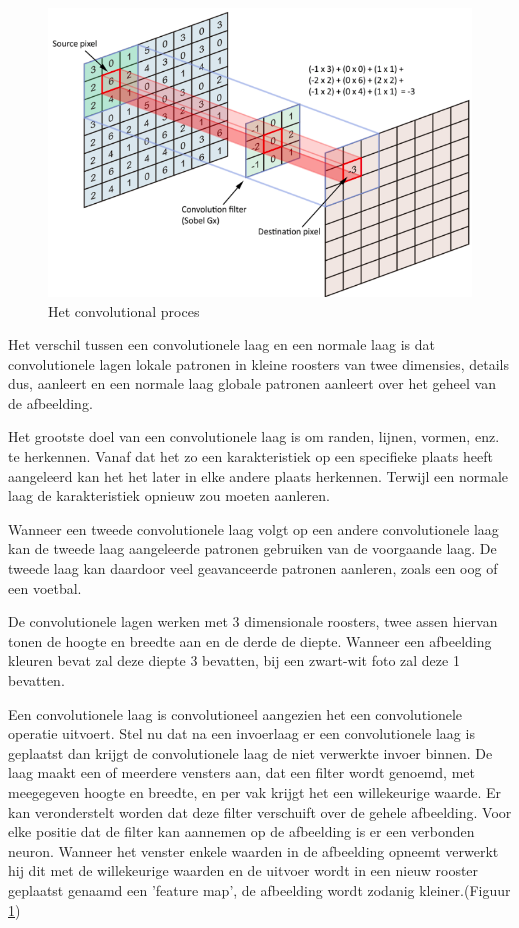 \begin{figure}
	
	
	\includegraphics[width=\linewidth]{img/convolution.png}
	\caption{Het convolutional proces}
	\label{tab:convolutional}
\end{figure}

Het verschil tussen een convolutionele laag en een normale laag is dat convolutionele lagen 
lokale patronen in kleine roosters van twee dimensies, details dus, aanleert en een normale laag globale patronen aanleert over het geheel van de afbeelding.

Het grootste doel van een convolutionele laag is om randen, lijnen, vormen, enz. te herkennen.
Vanaf dat het zo een karakteristiek op een specifieke plaats heeft aangeleerd kan het het later in elke andere plaats herkennen. Terwijl een normale laag de karakteristiek opnieuw zou moeten aanleren.

Wanneer een tweede convolutionele laag volgt op een andere convolutionele laag kan de tweede laag aangeleerde patronen gebruiken van de voorgaande laag.
De tweede laag kan daardoor veel geavanceerde patronen aanleren, zoals een oog of een voetbal.

De convolutionele lagen werken met 3 dimensionale roosters, twee assen hiervan tonen de hoogte en breedte aan en de derde de diepte. Wanneer een afbeelding kleuren bevat zal deze diepte 3 bevatten, bij een zwart-wit foto zal deze 1 bevatten.

Een convolutionele laag is convolutioneel aangezien het een convolutionele operatie uitvoert.
Stel nu dat na een invoerlaag er een convolutionele laag is geplaatst
dan krijgt de convolutionele laag de niet verwerkte invoer binnen.
De laag maakt een of meerdere vensters aan, dat een filter wordt genoemd, met meegegeven hoogte en breedte, en per vak krijgt het een willekeurige waarde. Er kan veronderstelt worden dat deze filter verschuift over de gehele afbeelding. Voor elke positie dat de filter kan aannemen op de afbeelding is er een verbonden neuron.
Wanneer het venster enkele waarden in de afbeelding opneemt verwerkt hij dit met de willekeurige waarden en de uitvoer wordt in een nieuw rooster geplaatst  genaamd een 'feature map', de afbeelding wordt zodanig kleiner.(Figuur \ref{tab:convolutional})

